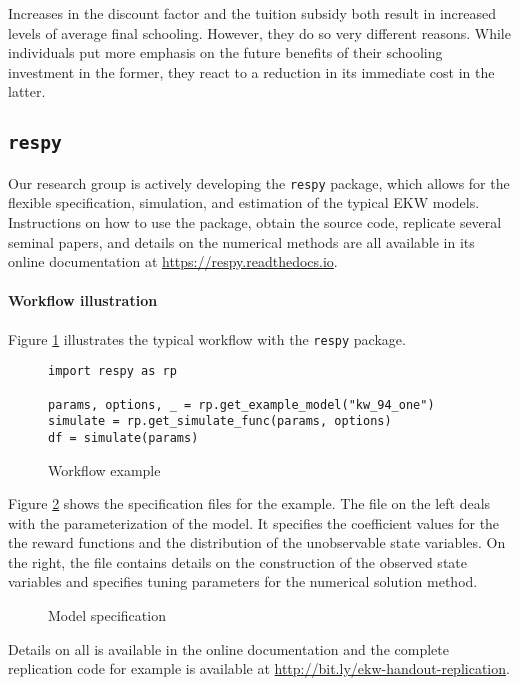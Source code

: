 \noindent Increases in the discount factor and the tuition subsidy both result in increased levels of average final schooling. However, they do so very different reasons. While individuals put more emphasis on the future benefits of their schooling investment in the former, they react to a reduction in its immediate cost in the latter.
\subsection{\texttt{respy}}
Our research group is actively developing the \verb+respy+ package, which allows for the flexible specification, simulation, and estimation of the typical EKW models. Instructions on how to use the package, obtain the source code, replicate several seminal papers, and details on the numerical methods are all available in its online documentation at \url{https://respy.readthedocs.io}.

\paragraph{Workflow illustration} Figure \ref{Workflow example} illustrates the typical workflow with the \verb+respy+ package.

\begin{figure}[ht!]\centering
\caption{Workflow example}\label{Workflow example}
\begin{lstlisting}
import respy as rp

params, options, _ = rp.get_example_model("kw_94_one")
simulate = rp.get_simulate_func(params, options)
df = simulate(params)

\end{lstlisting}
\end{figure}\FloatBarrier

\noindent Figure \ref{Model specification} shows the specification files for the example. The file on the left deals with the parameterization of the model. It specifies the coefficient values for the the reward functions and the distribution of the unobservable state variables. On the right, the file contains details on the construction of the observed state variables and specifies tuning parameters for the numerical solution method. 

\begin{figure}[h!]\centering
\caption{Model specification}\label{Model specification}
\hspace{0.3cm}
\end{figure}\FloatBarrier

\noindent Details on all is available in the online documentation and the complete replication code for example is available at \url{http://bit.ly/ekw-handout-replication}.
